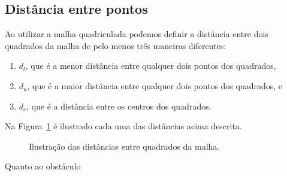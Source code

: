 \subsection{Distância entre pontos}
Ao utilizar a malha quadriculada podemos definir a dist\^{a}ncia entre dois
quadrados da malha de pelo menos tr\^{e}s maneiras diferentes:
\begin{enumerate}
    \item $d_l$, que \'{e} a menor dist\^{a}ncia entre qualquer dois pontos dos
        quadrados,
    \item $d_u$, que \'{e} a maior dist\^{a}ncia entre qualquer dois pontos dos
        quadrados, e
    \item $d_c$, que \'{e} a dist\^{a}ncia entre os centros dos quadrados.
\end{enumerate}
Na Figura~\ref{fig:dist_malha} \'{e} ilustrado cada uma das dist\^{a}ncias acima
descrita.
\begin{figure}[!htb]
    \centering
    \caption{Ilustra\c{c}\~{a}o das dist\^{a}ncias entre quadrados da malha.}
    \label{fig:dist_malha}
\end{figure}

Quanto ao obst\'{a}culo
